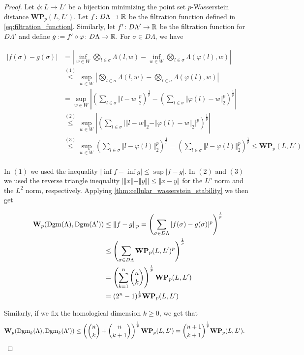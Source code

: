 	\begin{proof}
		Let $\phi\colon L\to L'$ be a bijection minimizing the point set $p$-Wasserstein distance $\textbf{WP}_p(L,L')$. Let $f\colon D\Lambda\to\mathbb{R}$ be the filtration function defined in \cref{eq:filtration_function}. Similarly, let $f'\colon D\Lambda'\to\mathbb{R}$ be the filtration function for $D\Lambda'$ and define $g:=f'\circ\varphi\colon D\Lambda\to\mathbb{R}$. For $\sigma\in D\Lambda$, we have
		
		\begin{align*}
			\vert f(\sigma) - g(\sigma)\vert &= \left\vert \inf_{w\in W}\bigotimes_{l\in\sigma}\Lambda(l,w) - \inf_{w\in W}\bigotimes_{l\in\sigma}\Lambda(\varphi(l),w)\right\vert\\
			&\overset{(1)}\leq\sup_{w\in W}\left\vert\bigotimes_{l\in\sigma}\Lambda(l,w)-\bigotimes_{l\in\sigma}\Lambda(\varphi(l),w)\right\vert\\
			&=\sup_{w\in W}\left\vert \left(\sum_{l\in\sigma}\Vert l-w\Vert_2^p\right)^{\frac{1}{p}} - \left(\sum_{l\in\sigma}\Vert \varphi(l)-w\Vert_2^p\right)^{\frac{1}{p}}\right\vert \\
			&\overset{(2)}\leq\sup_{w\in W}\left\vert \left(\sum_{l\in\sigma}\vert\Vert l-w\Vert_2-\Vert \varphi(l)-w\Vert_2\vert^p \right)^{\frac{1}{p}} \right\vert\\
			&\overset{(3)}\leq\sup_{w\in W}\left(\sum_{l\in\sigma}\Vert l-\varphi(l)\Vert_2^p \right)^{\frac{1}{p}} =\left(\sum_{l\in\sigma}\Vert l-\varphi(l)\Vert_2^p \right)^{\frac{1}{p}}\leq\textbf{WP}_p(L,L') \\
		\end{align*}
	
		In $(1)$ we used the inequality $\vert\inf f - \inf g\vert\leq \sup\vert f-g\vert$. In $(2)$ and $(3)$ we used the reverse triangle inequality $\vert\Vert x\Vert-\Vert y\Vert\vert\leq\Vert x-y\Vert$ for the $L^p$ norm and the $L^2$ norm, respectively. Applying \cref{thm:cellular_wasserstein_stability} we then get
		
		\begin{align*}
			\textbf{W}_p(\operatorname{Dgm}(\Lambda), \operatorname{Dgm}(\Lambda'))&\leq \Vert f-g\Vert_p = \left(\sum_{\sigma\in D\Lambda}\vert f(\sigma)-g(\sigma)\vert^p\right)^{\frac{1}{p}}\\
			&\leq\left(\sum_{\sigma\in D\Lambda}\textbf{WP}_p(L,L')^p\right)^{\frac{1}{p}}\\
			&= \left(\sum_{k=1}^n\binom{n}{k}\right)^{\frac{1}{p}}\textbf{WP}_p(L,L')\\
			&=(2^n-1)^{\frac{1}{p}}\textbf{WP}_p(L,L')
		\end{align*}
		
		Similarly, if we fix the homological dimension $k\geq0$, we get that
		\begin{align*}
			\textbf{W}_p(\operatorname{Dgm}_k(\Lambda), \operatorname{Dgm}_k(\Lambda'))&\leq\left(\binom{n}{k}+\binom{n}{k+1}\right)^{\frac{1}{p}}\textbf{WP}_p(L,L') = \binom{n+1}{k+1}^{\frac{1}{p}}\textbf{WP}_p(L,L').
		\end{align*}
	
	\end{proof}
	
